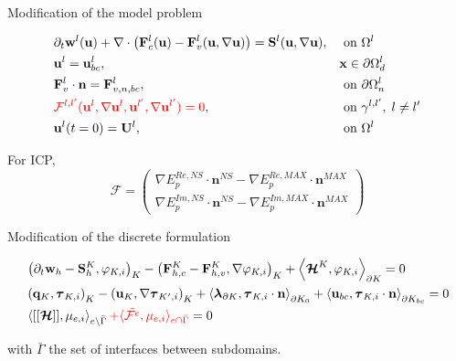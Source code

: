 \documentclass[24pt,t,table, aspectratio=169]{beamer}
\newcommand{\vecu}{\mathbf{u}}
\newcommand{\vecU}{\mathbf{U}}
\newcommand{\vecF}{\mathbf{F}}
\newcommand{\vecS}{\mathbf{S}}
\newcommand{\vecq}{\mathbf{q}}
\newcommand{\vecx}{\mathbf{x}}
\newcommand{\vecw}{\mathbf{w}}
\newcommand{\vectau}{\boldsymbol{\tau}}
\newcommand{\vecHcal}{\boldsymbol{\mathcal{H}}}
\newcommand{\veclambda}{\boldsymbol{\lambda}}
\newcommand{\vecn}{\mathbf{n}}
\newcommand{\Gammabar}{\bar{\Gamma}}
\begin{document}
\begin{frame}{Modification of the model problem}

\begin{framed}
\begin{equation*}
	\begin{aligned}
		& \partial_t \vecw^l(\vecu) + \nabla \cdot \left(\vecF_c^l(\vecu) - \vecF_v^l(\vecu, \nabla \vecu)\right) = \vecS^l(\vecu, \nabla \vecu), && \text{ on } \Omega^l\\
		& \vecu^l = \vecu_{bc}^l, && \vecx\in\partial\Omega^l_d\\
		& \vecF_v^l \cdot \vecn = \vecF_{v,n,bc}^l, &&  \text{ on } \partial\Omega^l_n\\
		& \textcolor{red}{\mathcal{F}^{l,l'}(\vecu^l, \nabla \vecu^l, \vecu^{l'}, \nabla \vecu^{l'}) = 0}, &&  \text{ on }  \gamma^{l,l'}, \; l \neq l'\\
		& \vecu^l(t = 0) = \vecU^l, &&  \text{ on }  \Omega^l
	\end{aligned}
\end{equation*}
\end{framed}

For ICP, 
\begin{equation*}
\mathcal{F} =
\begin{pmatrix}
\nabla E_p^{Re, NS} \cdot \vecn^{NS} - \nabla E_p^{Re, MAX} \cdot \vecn^{MAX}\\
\nabla E_p^{Im, NS} \cdot \vecn^{NS} - \nabla E_p^{Im, MAX} \cdot \vecn^{MAX}
\end{pmatrix}
\end{equation*}

\end{frame}

\begin{frame}{Modification of the discrete formulation}

\begin{framed}
\begin{equation*}
	\begin{aligned}
		& \left(\partial_t \vecw_h - \vecS_h^K, \varphi_{K,i} \right)_{K} - \left(\vecF_{h,c}^K - \vecF_{h,v}^K, \nabla \varphi_{K,i} \right)_{K} + \left\langle \vecHcal^K, \varphi_{K,i} \right\rangle_{\partial K} = 0\\
		& \left(\vecq_K, \vectau_{K,i}\right)_{K} - \left(\vecu_K, \nabla \vectau_{K',i}\right)_{K} + \left\langle \veclambda_{\partial K}, \vectau_{K,i} \cdot \vecn \right\rangle_{\partial K_0} + \left\langle \vecu_{bc}, \vectau_{K,i} \cdot \vecn \right\rangle_{\partial K_{bc}} = 0\\
		& \left\langle[[\vecHcal]], \mu_{e,i} \right\rangle_{e\setminus\Gammabar} \textcolor{red}{+ \langle \Tilde{\mathcal{F}^e}, \mu_{e,i}\rangle_{e\cap\Gammabar}} = 0\\
	\end{aligned}
\end{equation*}
\end{framed}

with $\bar{\Gamma}$ the set of interfaces between subdomains.

\end{frame}
\end{document}

